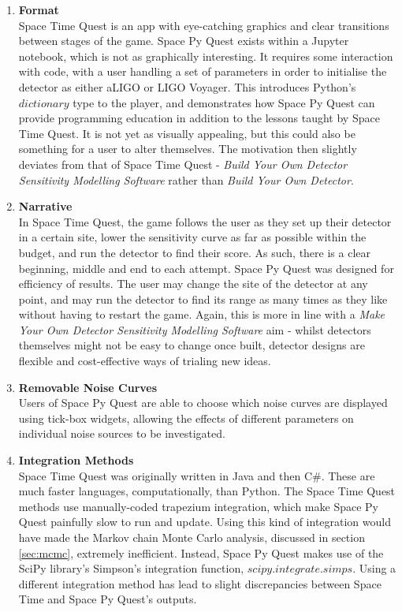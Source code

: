 \documentclass{article}
\begin{document}
\begin{enumerate}
    \item \textbf{Format} \\
    Space Time Quest is an app with eye-catching graphics and clear
    transitions between stages of the game. Space Py Quest exists
    within a Jupyter notebook, which is not as graphically
    interesting. It requires some interaction with code, with a user
    handling a set of parameters in order to initialise the detector
    as either aLIGO or LIGO Voyager. This introduces Python's
    $dictionary$ type to the player, and demonstrates how Space Py
    Quest can provide programming education in addition to the lessons
    taught by Space Time Quest. It is not yet as visually appealing,
    but this could also be something for a user to alter
    themselves. The motivation then slightly deviates from that of
    Space Time Quest - \textit{Build Your Own Detector Sensitivity
      Modelling Software} rather than \textit{Build Your Own
      Detector}.
    \item \textbf{Narrative} \\
    In Space Time Quest, the game follows the user as they set up
    their detector in a certain site, lower the sensitivity curve as
    far as possible within the budget, and run the detector to find
    their score. As such, there is a clear beginning, middle and end
    to each attempt. Space Py Quest was designed for efficiency of
    results. The user may change the site of the detector at any
    point, and may run the detector to find its range as many times as
    they like without having to restart the game. Again, this is more
    in line with a \textit{Make Your Own Detector Sensitivity
      Modelling Software} aim - whilst detectors themselves might not
    be easy to change once built, detector designs are flexible and
    cost-effective ways of trialing new ideas.
    \item \textbf{Removable Noise Curves} \\
    Users of Space Py Quest are able to choose which noise curves are
    displayed using tick-box widgets, allowing the effects of
    different parameters on individual noise sources to be
    investigated.
    \item \textbf{Integration Methods} \\
    Space Time Quest was originally written in Java and then
    C\#. These are much faster languages, computationally, than
    Python. The Space Time Quest methods use manually-coded trapezium
    integration, which make Space Py Quest painfully slow to run and
    update. Using this kind of integration would have made the Markov
    chain Monte Carlo analysis, discussed in section \ref{sec:mcmc},
    extremely inefficient. Instead, Space Py Quest makes use of the
    SciPy library's Simpson's integration function,
    $scipy.integrate.simps$. Using a different integration method has
    lead to  slight discrepancies between Space Time and Space Py Quest's outputs.
\end{enumerate}
\end{document}
